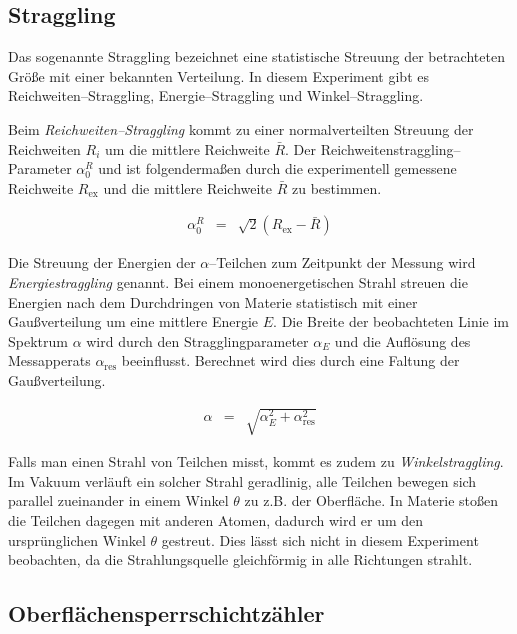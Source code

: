 \documentclass[12pt,a4paper]{scrartcl}
\numberwithin{equation}{section} %
\begin{document}
\hypertarget{straggling}{%
\subsection{Straggling}\label{straggling}}

Das sogenannte Straggling bezeichnet eine statistische Streuung der betrachteten Größe mit einer bekannten Verteilung. In diesem Experiment gibt es Reichweiten--Straggling, Energie--Straggling und Winkel--Straggling.

Beim \emph{Reichweiten--Straggling} kommt zu einer normalverteilten Streuung der Reichweiten $R_i$ um die mittlere Reichweite $\bar{R}$. Der Reichweitenstraggling--Parameter $\alpha^R_0$ und ist folgendermaßen durch die experimentell gemessene Reichweite
$R_\mathrm{ex}$ und die mittlere Reichweite $\bar{R}$ zu bestimmen.

\begin{eqnarray}
    \alpha^R_0 &=& \sqrt{2}\left(R_\mathrm{ex}-\bar{R}\right)
\end{eqnarray}

\noindent
Die Streuung der Energien der $\alpha$--Teilchen zum Zeitpunkt der Messung wird \emph{Energiestraggling} genannt. Bei einem monoenergetischen Strahl streuen die Energien nach dem Durchdringen von Materie statistisch mit einer Gaußverteilung um eine mittlere Energie $E$. Die Breite der beobachteten Linie im Spektrum $\alpha$ wird durch den Stragglingparameter $\alpha_E$ und die Auflösung des Messapperats $\alpha_\mathrm{res}$ beeinflusst. Berechnet wird dies durch eine Faltung der Gaußverteilung.

\begin{eqnarray}
    \alpha &=& \sqrt{\alpha_E^2 + \alpha_\mathrm{res}^2} \label{eq:straggling parameter}
\end{eqnarray}

\noindent
Falls man einen Strahl von Teilchen misst, kommt es zudem zu \emph{Winkelstraggling}. Im Vakuum verläuft ein solcher Strahl geradlinig, alle Teilchen bewegen sich parallel zueinander in einem Winkel $\theta$ zu z.B. der Oberfläche. In Materie stoßen die Teilchen dagegen mit anderen Atomen, dadurch wird er um den ursprünglichen Winkel $\theta$ gestreut. Dies lässt sich nicht in diesem Experiment beobachten, da die Strahlungsquelle gleichförmig in alle Richtungen strahlt.

\hypertarget{oberfluxe4chensperrschichtzuxe4hler}{%
\subsection{Oberflächensperrschichtzähler}\label{oberfluxe4chensperrschichtzuxe4hler}}
\end{document}
